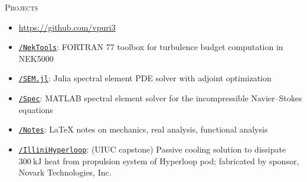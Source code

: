 \documentclass[10pt]{article}
\begin{document}
\begin{multicols}{2}
\textsc{Projects}
\columnbreak

\vspace{-1.75em}
\begin{itemize}[label=-]
    \setlength{\itemindent}{-1.50em}
    \setlength\itemsep{-0.25em}
    \item[]\hspace{-1.00em}\url{https://github.com/vpuri3}
    \item \href{https://github.com/vpuri3/NekTools}{\texttt{/NekTools}}: FORTRAN 77 toolbox for turbulence budget computation in NEK5000
    \item \href{https://github.com/vpuri3/SEM.jl}{\texttt{/SEM.jl}}: Julia spectral element PDE solver with adjoint optimization
    \item \href{https://github.com/vpuri3/Spec}{\texttt{/Spec}}: MATLAB spectral element solver for the incompressible Navier--Stokes equations
    \item \href{https://github.com/vpuri3/Notes}{\texttt{/Notes}}: \LaTeX{} notes on mechanics, real analysis, functional analysis
    \item \href{https://github.com/vpuri3/IlliniHyperloop}{\texttt{/IlliniHyperloop}}: (UIUC capstone) Passive cooling solution to dissipate $\SI{300}{\kilo \joule}$ heat from propulsion system of Hyperloop pod; fabricated by sponsor, Novark Technologies, Inc.
\end{itemize}
\vspace{-2.0em}

\end{multicols}
\vspace{-1.5em}
\vfill
\end{document}
